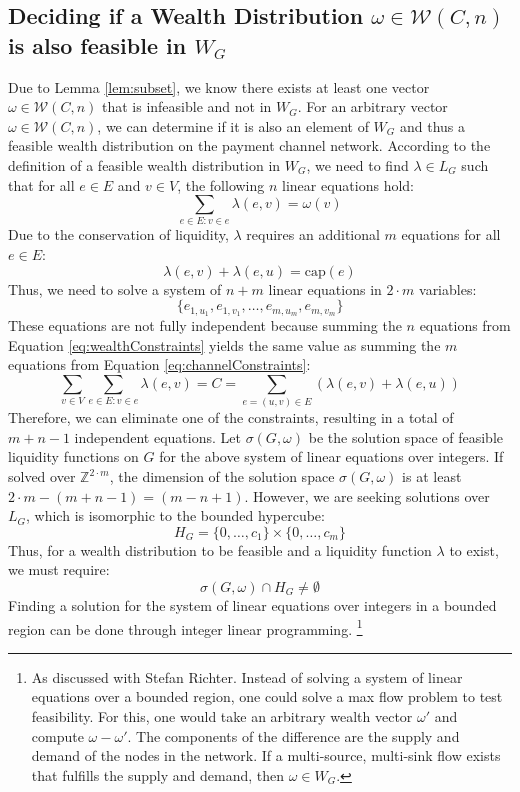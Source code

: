 \documentclass[10pt,twocolumn]{article}
\begin{document}
\subsection{Deciding if a Wealth Distribution $\omega\in\mathcal{W}(C,n)$ is also feasible in $W_G$}
\label{sec:isomorphism}

Due to Lemma \ref{lem:subset}, we know there exists at least one vector \( \omega \in \mathcal{W}(C,n) \) that is infeasible and not in \( W_G \).  
For an arbitrary vector \( \omega \in \mathcal{W}(C,n) \), we can determine if it is also an element of \( W_G \) and thus a feasible wealth distribution on the payment channel network.  
According to the definition of a feasible wealth distribution in \( W_G \), we need to find \( \lambda \in L_G \) such that for all \( e \in E \) and \( v \in V \), the following \( n \) linear equations hold:  
\begin{equation}
  \label{eq:wealthConstraints}
  \sum_{e \in E: v \in e}\lambda(e,v) = \omega(v)
\end{equation}
Due to the conservation of liquidity, \( \lambda \) requires an additional \( m \) equations for all \( e \in E \):  
\begin{equation}
  \label{eq:channelConstraints}
  \lambda(e,v) + \lambda(e,u) = \text{cap}(e)
\end{equation}
Thus, we need to solve a system of \( n + m \) linear equations in \( 2 \cdot m \) variables:  
\[ \{e_{1,{u_1}}, e_{1,v_1}, \dots, e_{m,u_m}, e_{m,v_m} \} \]  
These equations are not fully independent because summing the \( n \) equations from Equation \ref{eq:wealthConstraints} yields the same value as summing the \( m \) equations from Equation \ref{eq:channelConstraints}:  
\[ \sum_{v \in V}\sum_{e \in E: v \in e}\lambda(e,v) = C = \sum_{e=(u,v) \in E}\left(\lambda(e,v) + \lambda(e,u)\right) \]  
Therefore, we can eliminate one of the constraints, resulting in a total of \( m + n - 1 \) independent equations.  
Let \( \sigma(G,\omega) \) be the solution space of feasible liquidity functions on \( G \) for the above system of linear equations over integers.  
If solved over \( \mathbb{Z}^{2 \cdot m} \), the dimension of the solution space \( \sigma(G,\omega) \) is at least \( 2 \cdot m - (m + n - 1) = (m - n + 1) \). 
However, we are seeking solutions over \( L_G \), which is isomorphic to the bounded hypercube:  
\[ H_G = \{0, \dots, c_1\} \times \{0, \dots, c_m\} \]  
Thus, for a wealth distribution to be feasible and a liquidity function \( \lambda \) to exist, we must require:  
\begin{equation}
  \sigma(G,\omega) \cap H_G \neq \emptyset
\end{equation}
Finding a solution for the system of linear equations over integers in a bounded region can be done through integer linear programming.  
\footnote{As discussed with Stefan Richter. Instead of solving a system of linear equations over a bounded region, one could solve a max flow problem to test feasibility. For this, one would take an arbitrary wealth vector \( \omega' \) and compute \( \omega - \omega' \). The components of the difference are the supply and demand of the nodes in the network. If a multi-source, multi-sink flow exists that fulfills the supply and demand, then \( \omega \in W_G \).}
\end{document}
